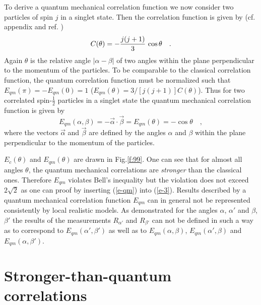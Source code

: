To derive a quantum mechanical correlation function we now consider
two particles of spin $j$ in a singlet state. Then the correlation
function is given by (cf. appendix and ref. \cite{gisin-peres})
\begin{equation}
C(\theta )=
- {j(j+1)\over 3} \, \cos \theta \quad .
\end{equation}
Again $\theta$ is the relative angle $\vert \alpha - \beta \vert$ of two
angles within the plane perpendicular to the momentum of the particles.
To be comparable to the classical correlation function,
the quantum correlation function must be normalized
such that $E_{qm}(\pi )=-E_{qm}(0)=1$
($E_{qm}(\theta ) = {3/[j(j+1)]} C(\theta )$).
Thus for two correlated spin-$\frac{1}{2}$ particles in a singlet state the
quantum mechanical correlation function is given by
\begin{equation}
E_{qm}(\alpha,\beta)=-\vec{\alpha} \cdot \vec{\beta} %
=E_{qm}(\theta) =
-\cos \theta \quad ,
\label{e-qm}
\end{equation}
where the vectors $\vec{\alpha}$ and $\vec{\beta}$ are defined by the angles
$\alpha$ and $\beta$ within the plane perpendicular to the momentum of the
particles.

$E_{c}(\theta)$ and $E_{qm}(\theta)$ are drawn in Fig.\ref{f:99}.
One can see
that for almost all angles $\theta$,
the quantum mechanical correlations are {\em stronger} than the
classical ones. Therefore $E_{qm}$ violates Bell\rq s inequality but the
violation does not exceed $2\sqrt{2}$ as one can proof by inserting
(\ref{e-qm}) into (\ref{e-3}). Results described by a
quantum mechanical correlation function $E_{qm}$ can in general not be
represented consistently by local realistic models.
As demonstrated for the angles $\alpha$, $\alpha '$ and
$\beta$, $\beta '$ the results of the measurements $R_{\alpha '}$ and
$R_{\beta '}$ can not be defined in such a way as to correspond to
$E_{qm}(\alpha ',\beta ')$  as well as to $E_{qm}(\alpha,\beta)$,
$E_{qm}(\alpha ',\beta)$ and $E_{qm}(\alpha,\beta ')$.


\section{Stronger-than-quantum correlations}

